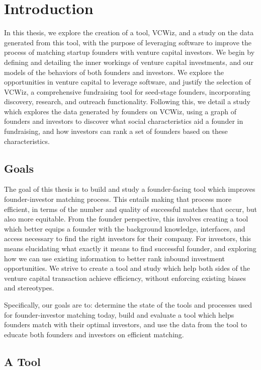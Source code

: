 \chapter{Introduction}

In this thesis, we explore the creation of a tool, VCWiz, and a study on the data generated from this tool, with the purpose of leveraging software to improve the process of matching startup founders with venture capital investors. We begin by defining and detailing the inner workings of venture capital investments, and our models of the behaviors of both founders and investors. We explore the opportunities in venture capital to leverage software, and justify the selection of VCWiz, a comprehensive fundraising tool for seed-stage founders, incorporating discovery, research, and outreach functionality. Following this, we detail a study which explores the data generated by founders on VCWiz, using a graph of founders and investors to discover what social characteristics aid a founder in fundraising, and how investors can rank a set of founders based on these characteristics.

\section{Goals}

The goal of this thesis is to build and study a founder-facing tool which improves founder-investor matching process. This entails making that process more efficient, in terms of the number and quality of successful matches that occur, but also more equitable. From the founder perspective, this involves creating a tool which better equips a founder with the background knowledge, interfaces, and access necessary to find the right investors for their company. For investors, this means elucidating what exactly it means to find successful founder, and exploring how we can use existing information to better rank inbound investment opportunities. We strive to create a tool and study which help both sides of the venture capital transaction achieve efficiency, without enforcing existing biases and stereotypes.

Specifically, our goals are to: determine the state of the tools and processes used for founder-investor matching today, build and evaluate a tool which helps founders match with their optimal investors, and use the data from the tool to educate both founders and investors on efficient matching.

\section{A Tool}

